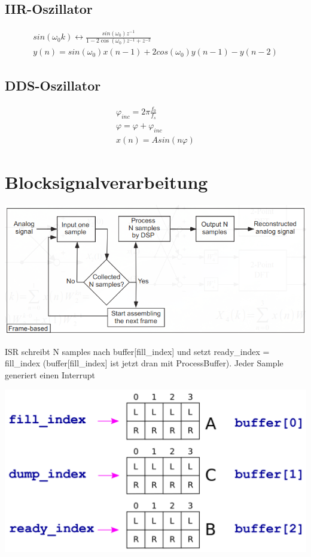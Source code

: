 \documentclass[10pt,a4paper]{article}
\begin{document}
\subsection{IIR-Oszillator}
  \begin{mdframed}[style=exercise]
    \begin{align}
    sin(\omega_0 k) \leftrightarrow \frac{sin(\omega_0)z^{-1}}{1-2\cos(\omega_0)z^{-1}+z^{-2}}\\
    y(n) = sin(\omega_0)x(n-1)+2cos(\omega_0)y(n-1)-y(n-2)
    \end{align}
  \end{mdframed}
\subsection{DDS-Oszillator}
  \begin{mdframed}[style=exercise]
    \begin{align}
        \varphi_{inc} = 2\pi\frac{f_0}{f_s}\\
        \varphi = \varphi + \varphi_{inc}\\
        x(n)= Asin(n\varphi)
    \end{align}
  \end{mdframed}

\section{Blocksignalverarbeitung}
  \begin{center}
      \includegraphics[width=.25\textwidth]{./img/frame.png}
  \end{center}
ISR schreibt N samples nach buffer[fill\_index] und setzt ready\_index = fill\_index (buffer[fill\_index] ist jetzt dran mit ProcessBuffer).
Jeder Sample generiert einen Interrupt
  \begin{center}
      \includegraphics[width=.25\textwidth]{./img/buffers.png}
  \end{center}
\end{document}
